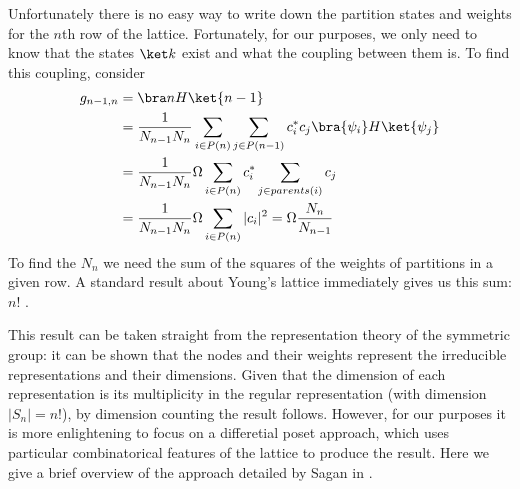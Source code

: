 Unfortunately there is no easy way to write down the partition states and weights for the $n$th row of the lattice. Fortunately, for our purposes, we only need to know that the states $\ket k$ exist and what the coupling between them is. To find this coupling, consider
\begin{align}
  g_{n-1,n} & = \bra nH\ket{n-1} \nonumber\\
  & = \frac{1}{N_{n-1}N_n}\sum_{i\in P(n)}\sum_{j\in
  P(n-1)}c_{i}^{*}c_{j}\bra{\psi_{i}}H\ket{\psi_{j}} \nonumber\\
  & = \frac{1}{N_{n-1}N_n}\Omega\sum_{i\in P(n)}c_{i}^{*}\sum_{j\in
  parents(i)}c_{j} \nonumber\\
  & = \frac{1}{N_{n-1}N_n}\Omega\sum_{i\in P(n)}|c_{i}|^{2} =
  \Omega\frac{ N_n}{N_{n-1}}\label{coupling_as_sum_c2}\end{align}
To find the $N_n$ we need the sum of the squares of the weights of partitions in a given row. A standard result about Young's lattice immediately gives us this sum: $n!$ \cite{STANLEY:1975p6605}.

This result can be taken straight from the representation theory of the symmetric group: it can be shown that the nodes and their weights represent the irreducible representations and their dimensions. Given that the dimension of each representation is its multiplicity in the regular representation (with dimension $|S_n| = n!$), by dimension counting the result follows. However, for our purposes it is more enlightening to focus on a differetial poset approach, which uses particular combinatorical features of the lattice to produce the result. Here we give a brief overview of the approach detailed by Sagan in \cite{Sagan:2001p6568}.

